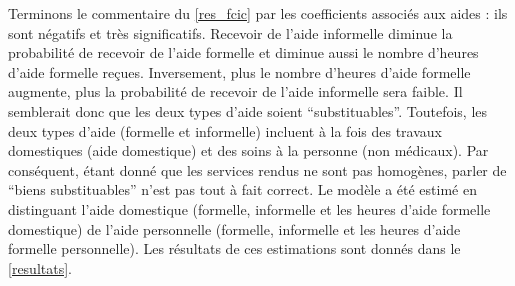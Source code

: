 \begin{Article}
\begin{refsection}[Bonnal]
Terminons le commentaire du \autoref{res_fcic} par les coefficients associés aux aides : ils sont négatifs et très significatifs. Recevoir de l'aide informelle diminue la probabilité de recevoir de l'aide formelle et diminue aussi le nombre d'heures d'aide formelle reçues. Inversement, plus le nombre d'heures d'aide formelle augmente, plus la probabilité de recevoir de l'aide informelle sera faible. Il semblerait donc que les deux types d'aide soient \enquote{substituables}. Toutefois, les deux types d'aide (formelle et informelle) incluent à la fois des travaux domestiques (aide domestique) et des soins à la personne (non médicaux). Par conséquent, étant donné que les services rendus ne sont pas homogènes, parler de \enquote{biens substituables} n'est pas tout à fait correct. Le modèle a été estimé en distinguant l'aide domestique (formelle, informelle et les heures d'aide formelle domestique) de l'aide personnelle (formelle, informelle et les heures d'aide formelle personnelle). Les résultats de ces estimations sont donnés dans le \autoref{resultats}.

\begin{table}
	\centering
	\caption{Résultats des estimations\label{resultats}}
\end{table}
\end{refsection}
\end{Article}
